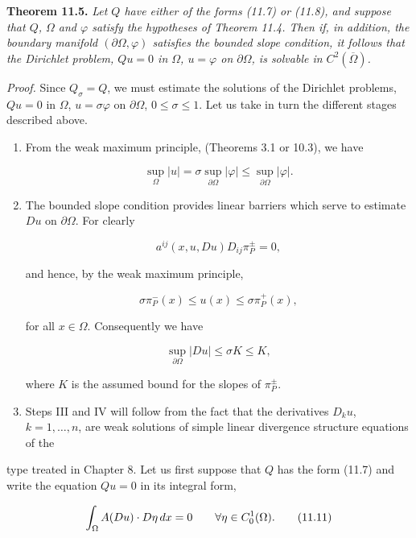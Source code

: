 \textbf{Theorem 11.5.} \textit{Let $Q$ have either of the forms (11.7) or (11.8), and suppose that
$Q$, $\Omega$ and $\varphi$ satisfy the hypotheses of Theorem 11.4. Then if, in addition, the boundary
manifold $(\partial\Omega,\varphi)$ satisfies the bounded slope condition, it follows that the Dirichlet
problem, $Qu=0$ in $\Omega$, $u=\varphi$ on $\partial\Omega$, is solvable in $C^2(\overline{\Omega})$.}

\textit{Proof.} Since $Q_\sigma=Q$, we must estimate the solutions of the Dirichlet problems,
$Qu=0$ in $\Omega$, $u=\sigma\varphi$ on $\partial\Omega$, $0\le \sigma\le 1$. Let us take in turn the different stages described
above.

\begin{enumerate}
\item[I.] From the weak maximum principle, (Theorems 3.1 or 10.3), we have

\begin{equation*}
\tag{11.9}
\sup_\Omega |u|=\sigma\sup_{\partial\Omega}|\varphi|\le \sup_{\partial\Omega}|\varphi|.
\end{equation*}

\item[II.] The bounded slope condition provides linear barriers which serve to
estimate $Du$ on $\partial\Omega$. For clearly

\[
a^{ij}(x,u,Du)D_{ij}\pi_P^\pm=0,
\]

and hence, by the weak maximum principle,

\[
\sigma\pi_P^-(x)\le u(x)\le \sigma\pi_P^+(x),
\]

for all $x\in\Omega$. Consequently we have

\begin{equation*}
\tag{11.10}
\sup_{\partial\Omega}|Du|\le \sigma K\le K,
\end{equation*}

where $K$ is the assumed bound for the slopes of $\pi_P^\pm$.
\item[III.] Steps III and IV will follow from the fact that the derivatives $D_k u$, $k=
1,\dots,n$, are weak solutions of simple linear divergence structure equations of the
\end{enumerate}


type treated in Chapter 8. Let us first suppose that $Q$ has the form (11.7) and write
the equation $Qu=0$ in its integral form,

\begin{equation}
\int_{\Omega} A(Du)\cdot D\eta \, dx = 0 \qquad \forall \eta \in C_0^1(\Omega).
\tag{11.11}
\end{equation}

